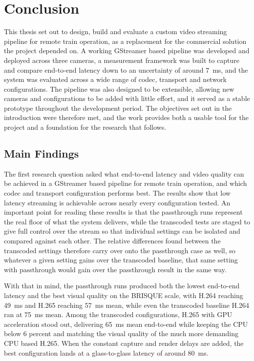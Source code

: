 \section{Conclusion}

This thesis set out to design, build and evaluate a custom video streaming pipeline for remote train operation, as a replacement for the commercial solution the project depended on. A working GStreamer based pipeline was developed and deployed across three cameras, a measurement framework was built to capture and compare end-to-end latency down to an uncertainty of around 7~ms, and the system was evaluated across a wide range of codec, transport and network configurations. The pipeline was also designed to be extensible, allowing new cameras and configurations to be added with little effort, and it served as a stable prototype throughout the development period. The objectives set out in the introduction were therefore met, and the work provides both a usable tool for the project and a foundation for the research that follows.

\subsection{Main Findings}

The first research question asked what end-to-end latency and video quality can be achieved in a GStreamer based pipeline for remote train operation, and which codec and transport configuration performs best. The results show that low latency streaming is achievable across nearly every configuration tested. An important point for reading these results is that the passthrough runs represent the real floor of what the system delivers, while the transcoded tests are staged to give full control over the stream so that individual settings can be isolated and compared against each other. The relative differences found between the transcoded settings therefore carry over onto the passthrough case as well, so whatever a given setting gains over the transcoded baseline, that same setting with passthrough would gain over the passthrough result in the same way. 

With that in mind, the passthrough runs produced both the lowest end-to-end latency and the best visual quality on the BRISQUE scale, with H.264 reaching 49~ms and H.265 reaching 57~ms mean, while even the transcoded baseline H.264 ran at 75~ms mean. Among the transcoded configurations, H.265 with GPU acceleration stood out, delivering 65~ms mean end-to-end while keeping the CPU below 6 percent and matching the visual quality of the much more demanding CPU based H.265. When the constant capture and render delays are added, the best configuration lands at a glass-to-glass latency of around 80~ms.

